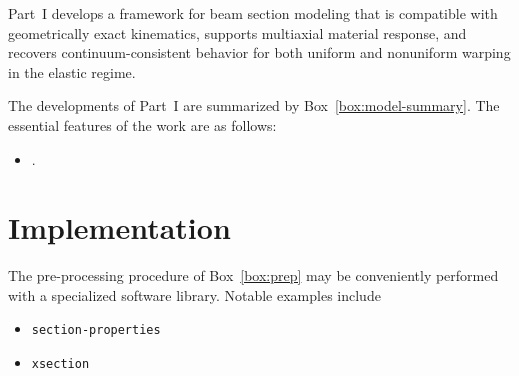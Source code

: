Part~I develops a framework for beam section modeling that is compatible with geometrically exact kinematics, supports multiaxial material response, and recovers continuum-consistent behavior for both uniform and nonuniform warping in the elastic regime. 

The developments of Part~I are summarized by Box~\ref{box:model-summary}.
The essential features of the work are as follows:
\begin{itemize}
  \item .
\end{itemize}



\section{Implementation}

The pre-processing procedure of Box~\ref{box:prep} may be conveniently performed with a specialized software library. Notable examples include 
\begin{itemize} 
\item \texttt{section-properties} \cite{leeuwen2024sectionproperties} 
\item \texttt{xsection}
\end{itemize}

